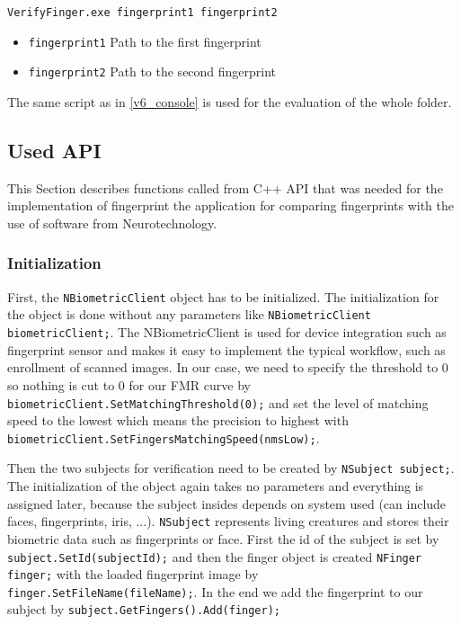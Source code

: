 \texttt{VerifyFinger.exe fingerprint1 fingerprint2}
\begin{itemize}
    \item \texttt{fingerprint1} Path to the first fingerprint
    \item \texttt{fingerprint2} Path to the second fingerprint
\end{itemize}

The same script as in \ref{v6_console} is used for the evaluation of the whole folder.

\subsection{Used API}
This Section describes functions called from C++ API that was needed for the implementation of fingerprint the application for comparing fingerprints with the use of software from Neurotechnology.

\subsubsection{Initialization}
First, the \texttt{NBiometricClient} object has to be initialized. The initialization for the object is done without any parameters like \texttt{NBiometricClient biometric\-Client;}. The NBiometricClient is used for device integration such as fingerprint sensor and makes it easy to implement the typical workflow, such as enrollment of scanned images. In our case, we need to specify the threshold to 0 so nothing is cut to 0 for our FMR curve by \\ \texttt{biometricClient.SetMatchingThreshold(0);} and set the level of matching speed to the lowest which means the precision to highest with\\ \texttt{biometricClient.SetFingersMatchingSpeed(nmsLow);}.

Then the two subjects for verification need to be created by \texttt{NSubject subject;}. The initialization of the object again takes no parameters and everything is assigned later, because the subject insides depends on system used (can include faces, fingerprints, iris, ...). \texttt{NSubject} represents living creatures and stores their biometric data such as fingerprints or face. First the id of the subject is set by \texttt{subject.SetId(subjectId);} and then the finger object is created \texttt{NFinger finger;} with the loaded fingerprint image by\\ \texttt{finger.SetFileName(fileName);}. In the end we add the fingerprint to our subject by \texttt{subject.GetFingers().Add(finger);}

